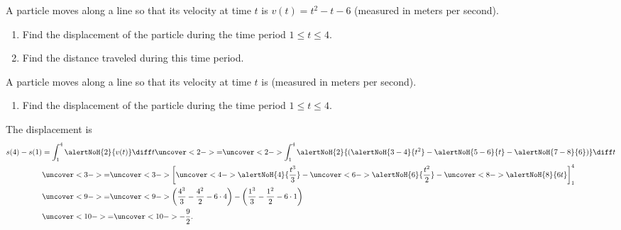 \begin{frame}[t]
\begin{example} %
A particle moves along a line so that its velocity at time $t$ is $v(t) = t^2 - t - 6$ (measured in meters per second).
\begin{enumerate}
\item  Find the displacement of the particle during the time period $1\leq t \leq 4$.
\item  Find the distance traveled during this time period.
\end{enumerate}
\end{example}
\end{frame}

\begin{frame}[t]
\begin{example} %
A particle moves along a line so that its velocity at time $t$ is  (measured in meters per second).
\begin{enumerate}
\item  Find the displacement of the particle during the time period $1\leq t \leq 4$.
\end{enumerate}
The displacement is
\abovedisplayskip=0pt
\belowdisplayskip=0pt
\begin{align*}
s(4) - s(1) & =  \int_1^4 \alertNoH{ 2}{v(t)} \diff t %
 \uncover<2->{=}  \uncover<2->{\int_1^4 \alertNoH{ 2}{(\alertNoH{ 3-4}{t^2} - \alertNoH{ 5-6}{t} - \alertNoH{ 7-8}{6})}\diff t}\\%
& \uncover<3->{=}  \uncover<3->{{\left[ \uncover<4->{\alertNoH{ 4}{\frac{t^3}{3}}} - \uncover<6->{\alertNoH{ 6}{\frac{t^2}{2}}} - \uncover<8->{\alertNoH{ 8}{6t}}  \right]}_1^4 }\\%
& \uncover<9->{=}  \uncover<9->{ \left( \frac{4^3}{3} - \frac{4^2}{2} - 6\cdot 4 \right) - \left( \frac{1^3}{3} - \frac{1^2}{2} - 6\cdot 1\right)}\\%
& \uncover<10->{=}  \uncover<10->{-\frac{9}{2}.}
\end{align*}
\end{example}
\end{frame}

